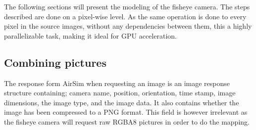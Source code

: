 The following sections will present the modeling of the fisheye camera. The steps described are done on a pixel-wise level. As the same operation is done to every pixel in the source images, without any dependencies between them, this a highly parallelizable task, making it ideal for GPU acceleration.

\subsection{Combining pictures} \label{sec:combining_pictures}

The response form AirSim when requesting an image is an image response structure containing; camera name, position, orientation, time stamp, image dimensions, the image type, and the image data. It also contains whether the image has been compressed to a PNG format. This field is however irrelevant as the fisheye camera will request raw RGBA8 pictures in order to do the mapping.

